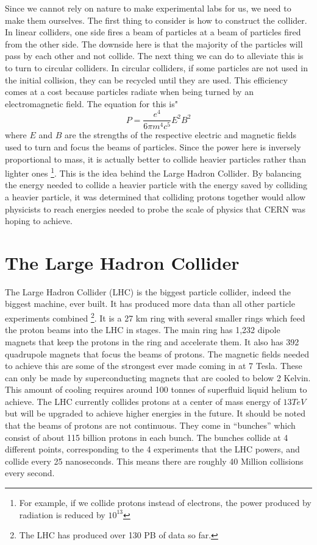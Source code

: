 Since we cannot rely on nature to make experimental labs for us, we need to make them ourselves.
The first thing to consider is how to construct the collider. In linear colliders, one side fires a beam of particles at a beam of particles fired from the other side.
The downside here is that the majority of the particles will pass by each other and not collide. The next thing we can do to alleviate this is to turn to circular colliders.
In circular colliders, if some particles are not used in the initial collision, they can be recycled until they are used.
This efficiency comes at a cost because particles radiate when being turned by an electromagnetic field. The equation for this is"
\begin{equation}
    P = \frac{e^4}{6 \pi m^4 c^5} E^2 B^2
\end{equation}
where $E$ and $B$ are the strengths of the respective electric and magnetic fields used to turn and focus the beams of particles.
Since the power here is inversely proportional to mass, it is actually better to collide heavier particles rather than lighter ones \footnote{For example, if we collide protons instead of electrons, the power produced by radiation is reduced by $10^{13}$}. 
This is the idea behind the Large Hadron Collider. By balancing the energy needed to collide a heavier particle with the energy saved by colliding a heavier particle, it was determined that colliding protons together would allow physicists to reach energies needed to probe the scale of physics that CERN was hoping to achieve.

\section{The Large Hadron Collider}

The Large Hadron Collider (LHC) is the biggest particle collider, indeed the biggest machine, ever built.
It has produced more data than all other particle experiments combined \footnote{The LHC has produced over 130 PB of data so far.}.
It is a 27 km ring with several smaller rings which feed the proton beams into the LHC in stages.
The main ring has 1,232 dipole magnets that keep the protons in the ring and accelerate them.
It also has 392 quadrupole magnets that focus the beams of protons. The magnetic fields needed to achieve this are some of the strongest ever made coming in at 7 Tesla.
These can only be made by superconducting magnets that are cooled to below 2 Kelvin.
This amount of cooling requires around 100 tonnes of superfluid liquid helium to achieve.
The LHC currently collides protons at a center of mass energy of $13 TeV$ but will be upgraded to achieve higher energies in the future.
It should be noted that the beams of protons are not continuous. They come in ``bunches'' which consist of about 115 billion protons in each bunch.
The bunches collide at 4 different points, corresponding to the 4 experiments that the LHC powers, and collide every 25 nanoseconds.
This means there are roughly 40 Million collisions every second. 

